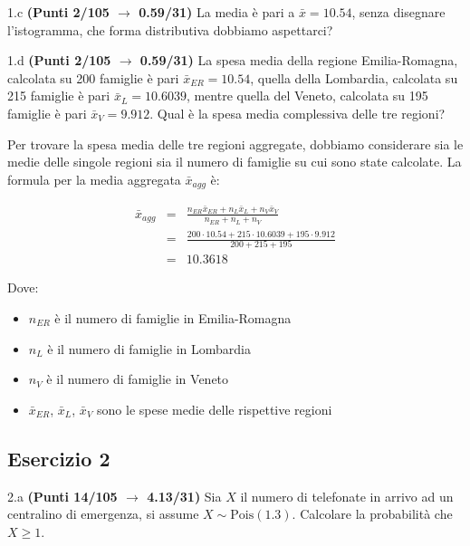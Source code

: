\documentclass[
  11pt,
]{book}
\providecommand{\tightlist}{%
  \setlength{\itemsep}{0pt}\setlength{\parskip}{0pt}}
\theoremstyle{mytheoremstyle}
\theoremstyle{mydefstyle}
\newenvironment{sol}
  {
  \begin{tcolorbox}[enhanced,breakable,arc=0.1mm,boxrule=1pt,colback=white,colframe=iblue,
  title=\bf \fontfamily{lmss}\selectfont \hspace{.5 cm} Soluzione,drop fuzzy shadow]

}{
\end{tcolorbox}
  }
\begin{document}
1.c \textbf{(Punti 2/105 \(\rightarrow\) 0.59/31)} La media è pari a \(\bar x=10.54\), senza disegnare l'istogramma, che forma distributiva dobbiamo aspettarci?

1.d \textbf{(Punti 2/105 \(\rightarrow\) 0.59/31)} La spesa media della regione Emilia-Romagna, calcolata su 200 famiglie è pari \(\bar x_{ER}=10.54\), quella della Lombardia, calcolata su 215 famiglie è pari \(\bar x_{L}=10.6039\), mentre quella del Veneto, calcolata su 195 famiglie è pari \(\bar x_{V}=9.912\). Qual è la spesa media complessiva delle tre regioni?

\begin{sol}

Per trovare la spesa media delle tre regioni aggregate, dobbiamo considerare sia le medie delle singole regioni sia il numero di famiglie su cui sono state calcolate. La formula per la media aggregata \(\bar{x}_{agg}\) è:

\begin{eqnarray*}
\bar{x}_{agg}    &=&  \frac{n_{ER} \bar{x}_{ER} + n_{L} \bar{x}_{L} + n_{V} \bar{x}_{V}}{n_{ER} + n_{L} + n_{V}}\\
&=& \frac{200\cdot10.54+215\cdot10.6039+195\cdot9.912}{200+215+195}\\
&=& 10.3618
\end{eqnarray*}

Dove:

\begin{itemize}
\tightlist
\item
  \(n_{ER}\) è il numero di famiglie in Emilia-Romagna
\item
  \(n_{L}\) è il numero di famiglie in Lombardia
\item
  \(n_{V}\) è il numero di famiglie in Veneto
\item
  \(\bar{x}_{ER}\), \(\bar{x}_{L}\), \(\bar{x}_{V}\) sono le spese medie delle rispettive regioni
\end{itemize}

\end{sol}

\subsection{Esercizio 2}\label{esercizio-2-42}

2.a \textbf{(Punti 14/105 \(\rightarrow\) 4.13/31)} Sia \(X\) il numero di telefonate in arrivo ad un centralino di emergenza, si assume \(X\sim\text{Pois}(1.3)\). Calcolare la probabilità che \(X\geq 1\).
\end{document}
